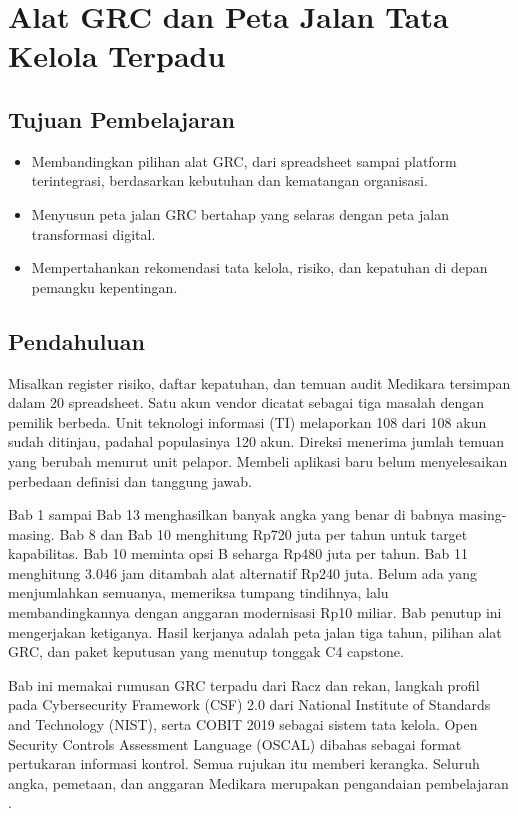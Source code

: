 \chapter{Alat GRC dan Peta Jalan Tata Kelola Terpadu}

\section*{Tujuan Pembelajaran}
\begin{itemize}
  \item Membandingkan pilihan alat GRC, dari spreadsheet sampai platform terintegrasi, berdasarkan
  kebutuhan dan kematangan organisasi.
  \item Menyusun peta jalan GRC bertahap yang selaras dengan peta jalan transformasi digital.
  \item Mempertahankan rekomendasi tata kelola, risiko, dan kepatuhan di depan pemangku
  kepentingan.
\end{itemize}

\section{Pendahuluan}

Misalkan register risiko, daftar kepatuhan, dan temuan audit Medikara tersimpan dalam 20
spreadsheet. Satu akun vendor dicatat sebagai tiga masalah dengan pemilik berbeda. Unit
teknologi informasi (TI) melaporkan 108 dari 108 akun sudah ditinjau, padahal populasinya 120
akun. Direksi menerima jumlah temuan yang berubah menurut unit pelapor. Membeli aplikasi baru
belum menyelesaikan perbedaan definisi dan tanggung jawab.

Bab 1 sampai Bab 13 menghasilkan banyak angka yang benar di babnya masing-masing. Bab 8 dan Bab
10 menghitung Rp720 juta per tahun untuk target kapabilitas. Bab 10 meminta opsi B seharga Rp480
juta per tahun. Bab 11 menghitung 3.046 jam ditambah alat alternatif Rp240 juta. Belum ada yang
menjumlahkan semuanya, memeriksa tumpang tindihnya, lalu membandingkannya dengan anggaran
modernisasi Rp10 miliar. Bab penutup ini mengerjakan ketiganya. Hasil kerjanya adalah peta jalan
tiga tahun, pilihan alat GRC, dan paket keputusan yang menutup tonggak C4 capstone.

Bab ini memakai rumusan GRC terpadu dari Racz dan rekan, langkah profil pada Cybersecurity
Framework (CSF) 2.0 dari National Institute of Standards and Technology (NIST), serta COBIT 2019
sebagai sistem tata kelola. Open Security Controls Assessment Language (OSCAL) dibahas sebagai
format pertukaran informasi kontrol. Semua rujukan itu memberi kerangka. Seluruh angka, pemetaan,
dan anggaran Medikara merupakan pengandaian pembelajaran
\cite{c01-racz2010,nistcsf2,cobit2019-intro,c08-isaca-press,c14-oscal}.

